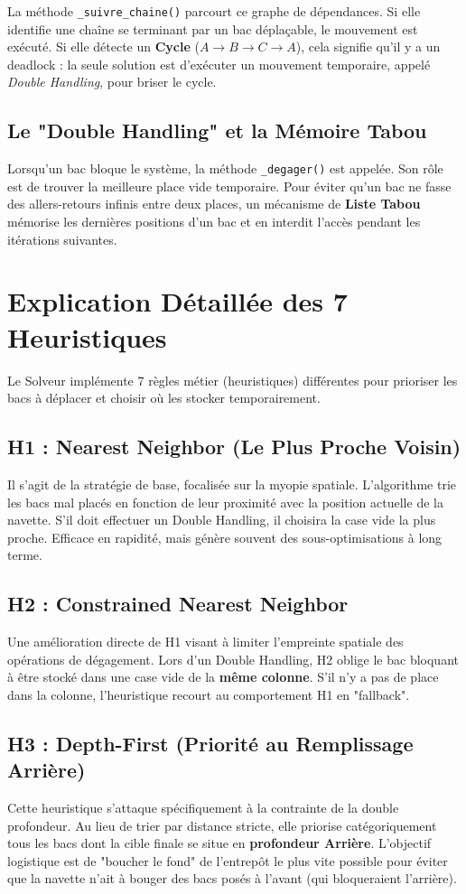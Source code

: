 \documentclass[12pt,a4paper]{article}
\begin{document}
La méthode \texttt{\_suivre\_chaine()} parcourt ce graphe de dépendances. Si elle identifie une chaîne se terminant par un bac déplaçable, le mouvement est exécuté. Si elle détecte un \textbf{Cycle} ($A \rightarrow B \rightarrow C \rightarrow A$), cela signifie qu'il y a un deadlock : la seule solution est d'exécuter un mouvement temporaire, appelé \textit{Double Handling}, pour briser le cycle.

\subsection{Le "Double Handling" et la Mémoire Tabou}
Lorsqu'un bac bloque le système, la méthode \texttt{\_degager()} est appelée. Son rôle est de trouver la meilleure place vide temporaire. Pour éviter qu'un bac ne fasse des allers-retours infinis entre deux places, un mécanisme de \textbf{Liste Tabou} mémorise les dernières positions d'un bac et en interdit l'accès pendant les itérations suivantes.

\section{Explication Détaillée des 7 Heuristiques}
Le Solveur implémente 7 règles métier (heuristiques) différentes pour prioriser les bacs à déplacer et choisir où les stocker temporairement.

\subsection{H1 : Nearest Neighbor (Le Plus Proche Voisin)}
Il s'agit de la stratégie de base, focalisée sur la myopie spatiale. L'algorithme trie les bacs mal placés en fonction de leur proximité avec la position actuelle de la navette. S'il doit effectuer un Double Handling, il choisira la case vide la plus proche. Efficace en rapidité, mais génère souvent des sous-optimisations à long terme.

\subsection{H2 : Constrained Nearest Neighbor}
Une amélioration directe de H1 visant à limiter l'empreinte spatiale des opérations de dégagement. Lors d'un Double Handling, H2 oblige le bac bloquant à être stocké dans une case vide de la \textbf{même colonne}. S'il n'y a pas de place dans la colonne, l'heuristique recourt au comportement H1 en "fallback".

\subsection{H3 : Depth-First (Priorité au Remplissage Arrière)}
Cette heuristique s'attaque spécifiquement à la contrainte de la double profondeur. Au lieu de trier par distance stricte, elle priorise catégoriquement tous les bacs dont la cible finale se situe en \textbf{profondeur Arrière}. L'objectif logistique est de "boucher le fond" de l'entrepôt le plus vite possible pour éviter que la navette n'ait à bouger des bacs posés à l'avant (qui bloqueraient l'arrière).
\end{document}
